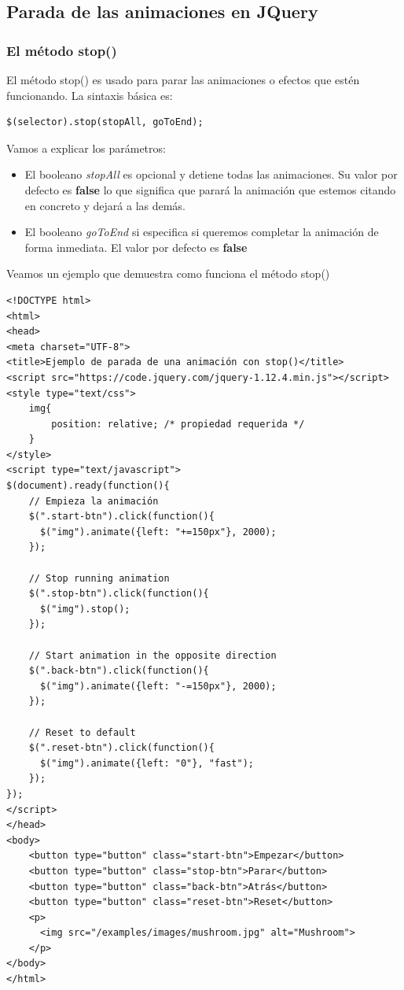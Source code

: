 \documentclass[a4paper, oneside]{article}
\begin{document}
\subsection{Parada de las animaciones en JQuery}
\label{sec:org4130031}

\subsubsection{El método stop()}
\label{sec:orgf1a0af4}

El método stop() es usado para parar las animaciones o efectos que estén funcionando. La sintaxis básica es:

\begin{verbatim}
$(selector).stop(stopAll, goToEnd);
\end{verbatim}

Vamos a explicar los parámetros:

\begin{itemize}
\item El booleano \emph{stopAll} es opcional y detiene todas las animaciones. Su valor por defecto es \textbf{false} lo que significa que parará la animación que estemos citando en concreto y dejará a las demás.
\item El booleano \emph{goToEnd} si especifica si queremos completar la animación de forma inmediata. El valor por defecto es \textbf{false}
\end{itemize}

Veamos un ejemplo que demuestra como funciona el método stop() 

\begin{verbatim}
<!DOCTYPE html>
<html>
<head>
<meta charset="UTF-8">
<title>Ejemplo de parada de una animación con stop()</title>
<script src="https://code.jquery.com/jquery-1.12.4.min.js"></script>
<style type="text/css">
    img{
        position: relative; /* propiedad requerida */
    }
</style>
<script type="text/javascript">
$(document).ready(function(){
    // Empieza la animación
    $(".start-btn").click(function(){
      $("img").animate({left: "+=150px"}, 2000);
    });

    // Stop running animation
    $(".stop-btn").click(function(){
      $("img").stop();
    });

    // Start animation in the opposite direction
    $(".back-btn").click(function(){
      $("img").animate({left: "-=150px"}, 2000);
    });

    // Reset to default
    $(".reset-btn").click(function(){
      $("img").animate({left: "0"}, "fast");
    });
});
</script>
</head>
<body>
    <button type="button" class="start-btn">Empezar</button>
    <button type="button" class="stop-btn">Parar</button>
    <button type="button" class="back-btn">Atrás</button>
    <button type="button" class="reset-btn">Reset</button>
    <p>
      <img src="/examples/images/mushroom.jpg" alt="Mushroom">
    </p>
</body>
</html>                                		                                		
\end{verbatim}
\end{document}

